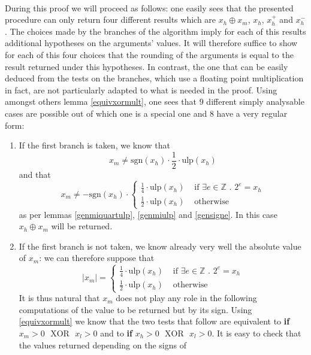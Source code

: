 \documentclass[a4paper,10pt,twoside]{article}
\newenvironment{proof}[1][Proof]{\begin{trivlist}
\item[\hskip \labelsep {\bfseries #1}]}{\end{trivlist}}
\newcommand{\Z}{\ensuremath{\mathbb {Z}}}
\newcommand{\hi}{\ensuremath{\mathit{h}}}
\newcommand{\mi}{\ensuremath{\mathit{m}}}
\newcommand{\lo}{\ensuremath{\mathit{l}}}
\newcommand{\mUlp}{\ensuremath{\mathrm{ulp}}}
\newcommand{\sgn}{\ensuremath{\mathrm{sgn}}}
\newcommand{\xor}{\ensuremath{\mbox{ }\mathrm{XOR}\mbox{ }}}
\begin{document}
\begin{proof} ~ \\
During this proof we will proceed as follows: one easily sees that the presented procedure can only return four
different results which are $x_\hi \oplus x_\mi$, $x_\hi$, $x_\hi^+$ and $x_\hi^-$.
The choices made by the branches of the algorithm imply for each of this results additional hypotheses on the
arguments' values. It will therefore suffice to show for each of this four choices that the rounding of the
arguments is equal to the result returned under this hypotheses. In contrast, the one that can be easily
deduced from the tests on the branches, which use a floating point multiplication in fact, are not particularly
adapted to what is needed in the proof. Using amongst others lemma \ref{equivxormult}, one sees that
$9$ different simply analysable cases are possible out of which one is a special one and $8$ have a very regular form:
\begin{enumerate}
\item If the first branch is taken, we know that
$$x_\mi \not = \sgn\left( x_\hi \right) \cdot \frac{1}{2} \cdot \mUlp \left( x_\hi \right)$$
and that
$$x_\mi \not = - \sgn\left( x_\hi \right) \cdot \left \lbrace
\begin{array}{ll} \frac{1}{4} \cdot \mUlp \left( x_\hi \right) & \mbox{ if } \exists e \in \Z \mbox{ . } 2^e = x_\hi \\
                  \frac{1}{2} \cdot \mUlp \left( x_\hi \right) & \mbox{ otherwise} \end{array} \right.$$
as per lemmas \ref{genmiquartulp}, \ref{genmiulp} and \ref{gensigne}.
In this case $x_\hi \oplus x_\mi$ will be returned.
\item If the first branch is not taken, we know already very well the absolute value of $x_\mi$:
we can therefore suppose that
$$\left \vert x_\mi \right \vert = \left \lbrace
\begin{array}{ll} \frac{1}{4} \cdot \mUlp \left( x_\hi \right) & \mbox{ if } \exists e \in \Z \mbox{ . } 2^e = x_\hi \\
                  \frac{1}{2} \cdot \mUlp \left( x_\hi \right) & \mbox{ otherwise} \end{array} \right.$$
It is thus natural that $x_\mi$ does not play any role in the following computations of the value to be returned but by its
sign.
Using \ref{equivxormult} we know that the two tests that follow are equivalent to
{{\bf if} $x_\mi > 0 \xor x_\lo > 0$} and to {{\bf if} $x_\hi > 0 \xor x_\lo > 0$}.
It is easy to check that the values returned depending on the signs of

\end{enumerate}
\end{proof}
\end{document}
